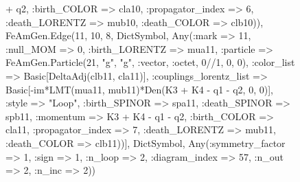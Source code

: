 \documentclass{revtex4}
\begin{document}
\begin{figure}[!htb]
\begin{center}
{+ q2, :birth_COLOR => cla10, :propagator_index => 6, :death_LORENTZ => mub10, :death_COLOR => clb10)), FeAmGen.Edge(11, 10, 8, Dict{Symbol, Any}(:mark => 11, :null_MOM => 0, :birth_LORENTZ => mua11, :particle => FeAmGen.Particle(21, "g", "g", :vector, :octet, 0//1, 0, 0), :color_list => Basic[DeltaAdj(clb11, cla11)], :couplings_lorentz_list => Basic[-im*LMT(mua11, mub11)*Den(K3 + K4 - q1 - q2, 0, 0)], :style => "Loop", :birth_SPINOR => spa11, :death_SPINOR => spb11, :momentum => K3 + K4 - q1 - q2, :birth_COLOR => cla11, :propagator_index => 7, :death_LORENTZ => mub11, :death_COLOR => clb11))], Dict{Symbol, Any}(:symmetry_factor => 1, :sign => 1, :n_loop => 2, :diagram_index => 57, :n_out => 2, :n_inc => 2)) 
}
\end{center}
\end{figure}
\end{document}
